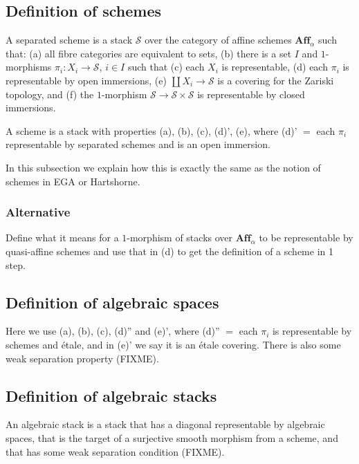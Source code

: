 \documentclass{amsart}
\theoremstyle{definition}
\theoremstyle{remark}
\numberwithin{equation}{subsection}
\begin{document}
\subsection{Definition of schemes}
\label{subsection-definition-schemes}

\noindent
A separated scheme is a stack $\mathcal{S}$ over the category of affine 
schemes $\mathbf{Aff}_\alpha$ such that: (a) all fibre categories are 
equivalent to sets, (b) there is a set $I$ and $1$-morphisms
$\pi_i : X_i \to \mathcal{S}$, $i\in I$ such that (c) each $X_i$ is
representable, (d) each $\pi_i$ is representable by open immersions,
(e) $\coprod X_i \to \mathcal{S}$ is a covering for the Zariski topology, 
and (f) the $1$-morphism $\mathcal{S} \to \mathcal{S}\times \mathcal{S}$ is
representable by closed immersions. 

\smallskip\noindent
A scheme is a stack with properties (a), (b), (c), (d)', (e), where
(d)' $=$ each $\pi_i$ representable by separated schemes and is an open 
immersion. 

\smallskip\noindent
In this subsection we explain how this is exactly the same as the notion of
schemes in EGA or Hartshorne.

\subsubsection{Alternative}
\label{subsubsection-schemes-alternative}

\noindent 
Define what it means for a $1$-morphism of stacks over $\textbf{Aff}_\alpha$
to be representable by quasi-affine schemes and use that in (d) to get the
definition of a scheme in 1 step.

\subsection{Definition of algebraic spaces}
\label{subsection-definition-algebraic-spaces}

\noindent
Here we use (a), (b), (c), (d)'' and (e)', where
(d)'' $=$ each $\pi_i$ is representable by schemes and \'etale, and
in (e)' we say it is an \'etale covering. There is also some weak
separation property (FIXME).

\subsection{Definition of algebraic stacks}
\label{subsection-definition-algebraic-stacks}

\noindent
An algebraic stack is a stack that has a diagonal representable by algebraic
spaces, that is the target of a surjective smooth morphism from a scheme,
and that has some weak separation condition (FIXME).
\end{document}
